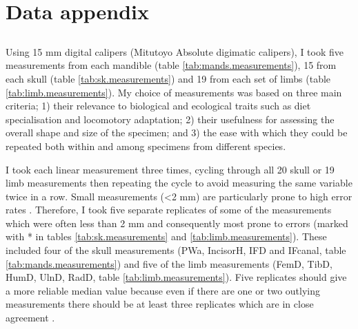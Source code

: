 

\chapter{Data appendix}
\label{appendix}


\section{} 
\label{sect:measurements} %

	Using 15 mm digital calipers (Mitutoyo Absolute digimatic calipers), I took five measurements from each mandible (table \ref{tab:mands.measurements}), 15 from each skull (table \ref{tab:sk.measurements}) and 19 from each set of limbs (table \ref{tab:limb.measurements}). My choice of  measurements was based on three main criteria; 1) their relevance to biological and ecological traits such as diet specialisation and locomotory adaptation; 2) their usefulness for assessing the overall shape and size of the specimen; and 3) the ease with which they could be repeated both within and among specimens from different species. 


	I took each linear measurement three times, cycling through all 20 skull or 19 limb measurements then repeating the cycle to avoid measuring the same variable twice in a row. Small measurements (<2 mm) are particularly prone to high error rates \citep{Cardini2008}. Therefore, I took five separate replicates of some of the measurements which were often less than 2 mm and consequently most prone to errors (marked with * in tables \ref{tab:sk.measurements} and \ref{tab:limb.measurements}). These included four of the skull measurements (PWa, IncisorH, IFD and IFcanal, table \ref{tab:mands.measurements}) and five of the limb measurements (FemD, TibD, HumD, UlnD, RadD, table \ref{tab:limb.measurements}). 
	Five replicates should give a more reliable median value because even if there are one or two outlying measurements there should be at least three replicates which are in close agreement \citep{Cooper2009}.
	

